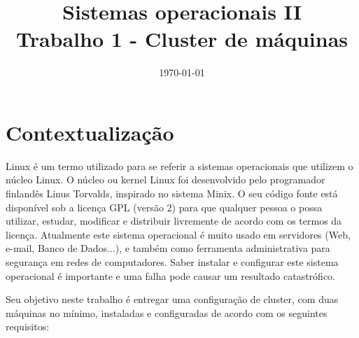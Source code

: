\documentclass[
	12pt,				%
	openany,			%
	a4paper,			%
	chapter=TITLE,		%
	section=TITLE,		%
	english,
	brazil				%
]{abntex2}
\title{Sistemas operacionais II \\ Trabalho 1 - Cluster de máquinas}
\date{\today}
\begin{document}
\maketitle

\chapter{Contextualização}

Linux é um termo utilizado para se referir a sistemas operacionais que utilizem o núcleo Linux. O núcleo ou kernel Linux foi desenvolvido pelo programador finlandês Linus Torvalds, inspirado no sistema Minix. O seu código fonte está disponível sob a licença GPL (versão 2) para que qualquer pessoa o possa utilizar, estudar, modificar e distribuir livremente de acordo com os termos da licença. Atualmente este sistema operacional é muito usado em servidores (Web, e-mail, Banco de Dados...), e também como ferramenta administrativa para segurança em redes de computadores. Saber instalar e configurar este sistema operacional é importante e uma falha pode causar um resultado catastrófico.

Seu objetivo neste trabalho é entregar uma configuração de cluster, com duas máquinas no mínimo, instaladas e configuradas de acordo com os seguintes requisitos:
\end{document}
